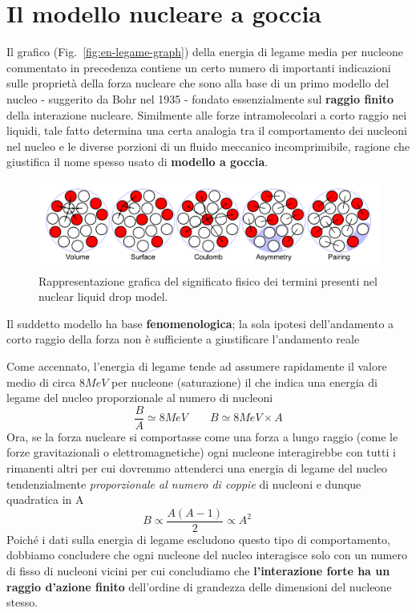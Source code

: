 \section{Il modello nucleare a goccia}\label{sec:il-modello-nucleare-a-goccia}
Il grafico (Fig.~\ref{fig:en-legame-graph}) della energia di legame media per nucleone commentato in precedenza
contiene un certo numero di importanti indicazioni
sulle proprietà della forza nucleare che sono alla base di un primo
modello del nucleo - suggerito da Bohr nel 1935 - fondato essenzialmente
sul \textbf{raggio finito} della interazione nucleare.
Similmente alle forze intramolecolari a corto raggio nei liquidi,
tale fatto determina una certa analogia tra il comportamento dei nucleoni
nel nucleo e le diverse porzioni di un fluido meccanico incomprimibile, ragione che
giustifica il nome spesso usato di \textbf{modello a goccia}.
\begin{figure}
	\centering
	\includegraphics{figs/liquid-drop-model}
	\caption{Rappresentazione grafica del significato fisico dei termini presenti nel nuclear liquid drop model.}
	\label{fig:liquid-drop-model}
\end{figure}

Il suddetto modello ha base \textbf{fenomenologica}; la sola ipotesi
dell'andamento a corto raggio della forza non è sufficiente a
giustificare l'andamento reale

Come accennato, l'energia di legame tende ad assumere rapidamente il
valore medio di circa \(8MeV\) per nucleone (saturazione) il che indica
una energia di legame del nucleo proporzionale al numero di nucleoni
\begin{equation}
	\frac{B}{A} \simeq 8 MeV \qquad B \simeq 8 MeV \times A
    \label{eq:saturation-binding-energy-per-nucleon}
\end{equation}
Ora, se la forza nucleare si comportasse come una forza a lungo
raggio (come le forze gravitazionali o elettromagnetiche) ogni nucleone
interagirebbe con tutti i rimanenti altri per cui dovremmo attenderci
una energia di legame del nucleo tendenzialmente \emph{proporzionale al numero
di coppie} di nucleoni e dunque quadratica in A
\[
	B \propto \frac{A(A-1)}{2} \propto A^{2} \qquad
\]
Poiché i dati sulla energia di legame escludono questo tipo di
comportamento, dobbiamo concludere che ogni nucleone del nucleo
interagisce solo con un numero di fisso di nucleoni vicini per cui
concludiamo che \textbf{l'interazione forte ha un raggio d'azione finito}
dell'ordine di grandezza delle dimensioni del nucleone stesso.

